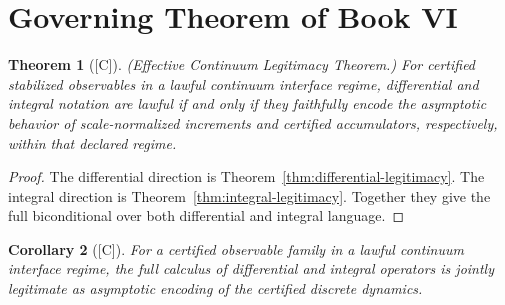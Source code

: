 \documentclass[12pt,oneside]{amsbook}
\theoremstyle{plain}
\newtheorem{theorem}{Theorem}[section]
\newtheorem{corollary}[theorem]{Corollary}
\theoremstyle{definition}
\theoremstyle{remark}
\newcommand{\status}[1]{\textup{[#1]}}
\begin{document}
\section{Governing Theorem of Book VI}

\begin{theorem}[\status{C}]\label{thm:governing}
\textup{(Effective Continuum Legitimacy Theorem.)}  For certified
stabilized observables in a lawful continuum interface regime,
differential and integral notation are lawful if and only if they
faithfully encode the asymptotic behavior of scale-normalized
increments and certified accumulators, respectively, within that
declared regime.
\end{theorem}

\begin{proof}
The differential direction is Theorem~\ref{thm:differential-legitimacy}.
The integral direction is Theorem~\ref{thm:integral-legitimacy}.
Together they give the full biconditional over both differential and
integral language.
\end{proof}

\begin{corollary}[\status{C}]\label{cor:joint-legitimacy}
For a certified observable family in a lawful continuum interface
regime, the full calculus of differential and integral operators is
jointly legitimate as asymptotic encoding of the certified discrete
dynamics.
\end{corollary}
\end{document}
